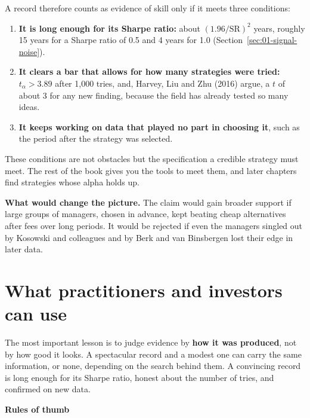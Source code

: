 A record therefore counts as evidence of skill only if it meets three conditions:

\begin{enumerate}
  \item \textbf{It is long enough for its Sharpe ratio:} about $(1.96/\mathrm{SR})^2$ years, roughly 15 years for a Sharpe ratio of 0.5 and 4 years for 1.0 (Section~\ref{sec:01-signal-noise}).
  \item \textbf{It clears a bar that allows for how many strategies were tried:} $t_\alpha > 3.89$ after 1,000 tries, and, Harvey, Liu and Zhu (2016) argue, a $t$ of about 3 for any new finding, because the field has already tested so many ideas.
  \item \textbf{It keeps working on data that played no part in choosing it}, such as the period after the strategy was selected.
\end{enumerate}

These conditions are not obstacles but the specification a credible strategy must meet. The rest of the book gives you the tools to meet them, and later chapters find strategies whose alpha holds up.

\textbf{What would change the picture.} The claim would gain broader support if large groups of managers, chosen in advance, kept beating cheap alternatives after fees over long periods. It would be rejected if even the managers singled out by Kosowski and colleagues and by Berk and van Binsbergen lost their edge in later data.

\section{What practitioners and investors can use}
\label{sec:01-investors}

The most important lesson is to judge evidence by \textbf{how it was produced}, not by how good it looks. A spectacular record and a modest one can carry the same information, or none, depending on the search behind them. A convincing record is long enough for its Sharpe ratio, honest about the number of tries, and confirmed on new data.

\textbf{Rules of thumb}


